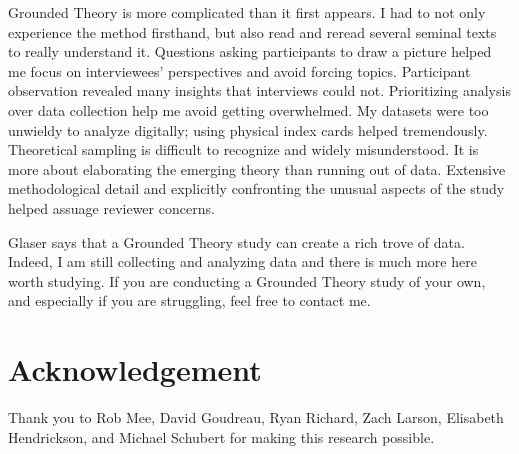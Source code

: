 
Grounded Theory is more complicated than it first appears. I had to not only experience the method firsthand, but also read and reread several seminal texts to really understand it.
Questions asking participants to draw a picture helped me focus on interviewees' perspectives and avoid forcing topics. 
Participant observation revealed many insights that interviews could not. 
Prioritizing analysis over data collection help me avoid getting overwhelmed.
My datasets were too unwieldy to analyze digitally; using physical index cards helped tremendously. 
Theoretical sampling is difficult to recognize and widely misunderstood. It is more about elaborating the emerging theory than running out of data. 
Extensive methodological detail and explicitly confronting the unusual aspects of the study helped assuage reviewer concerns. 

Glaser says that a Grounded Theory study can create a rich trove of data. Indeed, I am still collecting and analyzing data and there is much more here worth studying. If you are conducting a Grounded Theory study of your own, and especially if you are struggling, feel free to contact me.

\section*{Acknowledgement}
Thank you to Rob Mee, David Goudreau, Ryan Richard, Zach Larson, Elisabeth Hendrickson, and Michael Schubert for making this research possible.






















